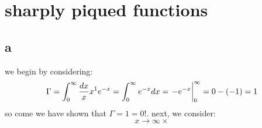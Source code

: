 \section{sharply piqued functions}
\subsection{a}
we begin by considering:
\begin{equation}
    \Gamma =\int_{0}^{
\infty } \frac{dx}{x} x^{1} e^{-x}=\int_{0}^{\infty } e^{-x}dx = \eval{-e^{-x}}_{0}^{\infty }=0-(-1)=1
\end{equation}
so come we have shown that $\Gamma =1=0!$.
next, we consider:
\begin{equation}
    x\rightarrow \infty \times 
\end{equation}